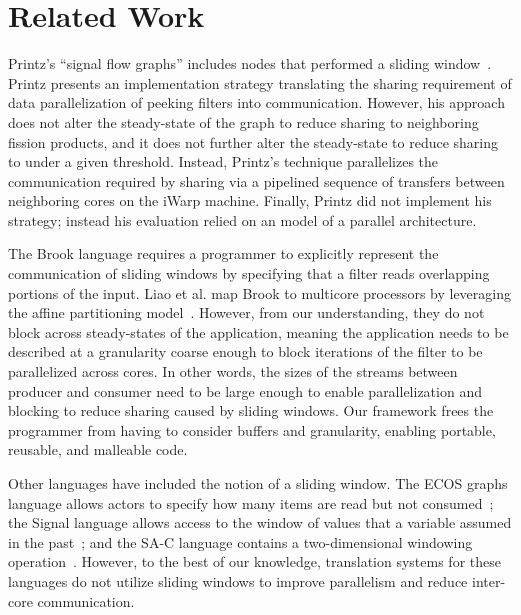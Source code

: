 \section{Related Work}

Printz's ``signal flow graphs'' includes nodes that performed a
sliding window~\cite{printz91thesis}.  Printz presents an
implementation strategy translating the sharing requirement of data
parallelization of peeking filters into communication.  However, his
approach does not alter the steady-state of the graph to reduce
sharing to neighboring fission products, and it does not further alter
the steady-state to reduce sharing to under a given threshold.
Instead, Printz's technique parallelizes the communication required by
sharing via a pipelined sequence of transfers between neighboring
cores on the iWarp machine.  Finally, Printz did not implement his
strategy; instead his evaluation relied on an model of a parallel
architecture.


The Brook language requires a programmer to explicitly represent the
communication of sliding windows by specifying that a filter reads
overlapping portions of the input. Liao et al. map Brook to multicore
processors by leveraging the affine partitioning
model~\cite{liao06brook}. However, from our understanding, they do not
block across steady-states of the application, meaning the application
needs to be described at a granularity coarse enough to block
iterations of the filter to be parallelized across cores. In other
words, the sizes of the streams between producer and consumer need to
be large enough to enable parallelization and blocking to reduce
sharing caused by sliding windows.  Our framework frees the programmer
from having to consider buffers and granularity, enabling portable,
reusable, and malleable code.

Other languages have included the notion of a sliding window.  The ECOS
graphs language allows actors to specify how many items are read but
not consumed~\cite{huang_ecos_1992}; the Signal language allows access
to the window of values that a variable assumed in the
past~\cite{le_guernic_signal--data_1986}; and the SA-C language
contains a two-dimensional windowing
operation~\cite{draper_compiling_2001}.  However, to the best of our
knowledge, translation systems for these languages do not utilize
sliding windows to improve parallelism and reduce inter-core
communication.

